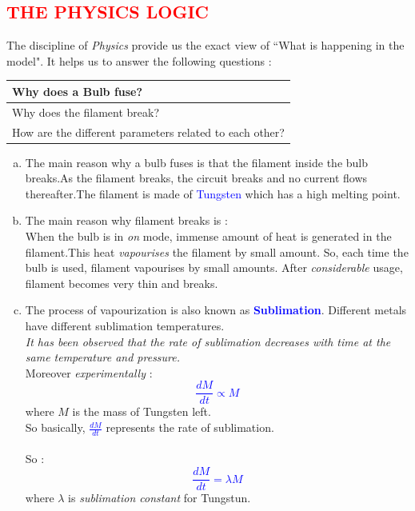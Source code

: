 \documentclass[a4paper]{article}
\begin{document}
\subsection{\textcolor{red}{\huge{THE PHYSICS LOGIC}}}
\Large{The discipline of \textit{Physics} provide us the exact view of ``What is happening in the model".}
\vspace{1.5 cm}
\Large{It helps us to answer the following questions : }

\begin{tabular}{|l|}
\hline
Why does a Bulb fuse?\\
\hline
Why does the filament break?\\
\hline
How are the different parameters related to each other?\\
\hline
\end{tabular}
\vspace{2 cm}
\begin{enumerate}[(a)]
\item The main reason why a bulb fuses is that the filament inside the bulb breaks.As the filament breaks, the circuit breaks and no current flows thereafter.The filament is made of \textcolor{blue}{Tungsten} which has a high melting point.
\item The main reason why filament breaks is :\\
When the bulb is in \textit{on} mode, immense amount of heat is generated in the filament.This heat \textit{vapourises} the filament by small amount. So, each time the bulb is used, filament vapourises by small amounts. After \textit{considerable} usage, filament becomes very thin and breaks.
\item The process of vapourization is also known as \textcolor{blue}{\textbf{Sublimation}}.
Different metals have different sublimation temperatures.\\
\textit{It has been observed that the rate of sublimation decreases with time at the same temperature and pressure.}\\
Moreover \textit{experimentally} :
\Huge{\textcolor{blue}{$$\frac{dM}{dt}\propto M $$}}
\Large{where $M$ is the mass of Tungsten left.}\\
\Large{So basically,\textcolor{blue}{\huge{ $\frac{dM}{dt}$}} represents the rate of sublimation.}\\ 
\vspace{1 cm}\\
So :
\textcolor{blue}{\huge{$$\frac{dM}{dt}=\lambda M$$}}
where $\lambda$ is \textit{sublimation constant} for Tungstun. 
\end{enumerate}
\end{document}
